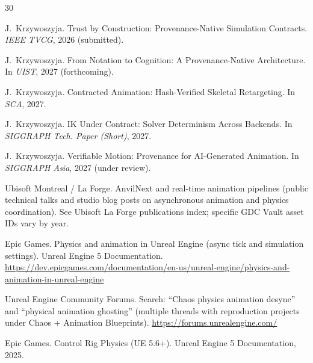 \documentclass[sigconf,nonacm]{acmart}
\begin{document}
\iffalse
\begin{thebibliography}{30}

J.~Krzywoszyja.
\newblock Trust by Construction: Provenance-Native Simulation Contracts.
\newblock \emph{IEEE TVCG}, 2026 (submitted).

J.~Krzywoszyja.
\newblock From Notation to Cognition: A Provenance-Native Architecture.
\newblock In \emph{UIST}, 2027 (forthcoming).

J.~Krzywoszyja.
\newblock Contracted Animation: Hash-Verified Skeletal Retargeting.
\newblock In \emph{SCA}, 2027.

J.~Krzywoszyja.
\newblock IK Under Contract: Solver Determinism Across Backends.
\newblock In \emph{SIGGRAPH Tech. Paper (Short)}, 2027.

J.~Krzywoszyja.
\newblock Verifiable Motion: Provenance for AI-Generated Animation.
\newblock In \emph{SIGGRAPH Asia}, 2027 (under review).


Ubisoft Montreal / La Forge.
\newblock AnvilNext and real-time animation pipelines (public
  technical talks and studio blog posts on asynchronous animation
  and physics coordination).
\newblock See Ubisoft La Forge publications index; specific GDC
  Vault asset IDs vary by year.

Epic Games.
\newblock Physics and animation in Unreal Engine (async tick and
  simulation settings).
\newblock Unreal Engine 5 Documentation.
\newblock \url{https://dev.epicgames.com/documentation/en-us/unreal-engine/physics-and-animation-in-unreal-engine}

Unreal Engine Community Forums.
\newblock Search: ``Chaos physics animation desync'' and
  ``physical animation ghosting'' (multiple threads with
  reproduction projects under Chaos + Animation Blueprints).
\newblock \url{https://forums.unrealengine.com/}

Epic Games.
\newblock Control Rig Physics (UE 5.6+).
\newblock Unreal Engine 5 Documentation, 2025.


\end{thebibliography}
\end{document}
